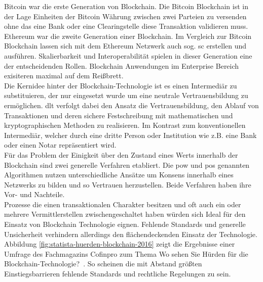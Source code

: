 Bitcoin war die erste Generation von Blockchain. Die Bitcoin Blockchain ist in der Lage Einheiten der Bitcoin Währung zwischen zwei Parteien zu versenden ohne das eine Bank oder eine Clearingstelle diese Transaktion validieren muss. \cite[vgl.]{Nakamoto2009} Ethereum war die zweite Generation einer Blockchain. Im Vergleich zur Bitcoin Blockchain lassen sich mit dem Ethereum Netzwerk auch sog. \ac{sc} erstellen und ausführen.\cite[vgl.]{Buterin2014} Skalierbarkeit und Interoperabilität spielen in dieser Generation eine der entscheidenden Rollen. \cite[vgl.]{Cardano} Blockchain Anwendungen im Enterprise Bereich exisiteren maximal auf dem Reißbrett.\\

Die Kernidee hinter der Blockchain-Technologie ist es einen Intermediär zu substituieren, der nur eingesetzt wurde um eine neutrale Vertrauensbildung zu ermöglichen. \ac{dlt} verfolgt dabei den Ansatz die Vertrauensbildung, den Ablauf von Transaktionen und deren sichere Festschreibung mit mathematischen und kryptographischen Methoden zu realisieren. Im Kontrast zum konventionellen Intermediär, welcher durch eine dritte Person oder Institution wie z.B. eine Bank oder einen Notar repräsentiert wird.\\

Für das Problem der Einigkeit über den Zustand eines Werts innerhalb der Blockchain sind zwei generelle Verfahren etabliert. Die \ac{pow} und \ac{pos} genannten Algorithmen nutzen unterschiedliche Ansätze um Konsens innerhalb eines Netzwerks zu bilden und so Vertrauen herzustellen. Beide Verfahren haben ihre Vor- und Nachteile.\\

Prozesse die einen transaktionalen Charakter besitzen und oft auch ein oder mehrere Vermittlerstellen zwischengeschaltet haben würden sich Ideal für den Einsatz von Blockchain Technologie eignen. Fehlende Standards und generelle Unsicherheit verhindern allerdings den flächendeckenden Einsatz der Technologie.\\

Abbildung \ref{fig:statista-huerden-blockchain-2016} zeigt die Ergebnisse einer Umfrage des Fachmagazins Cofinpro zum Thema \glqq Wo sehen Sie Hürden für die Blockchain-Technologie?\grqq~. So scheinen die mit Abstand größten Einstiegsbarrieren fehlende Standards und rechtliche Regelungen zu sein.

